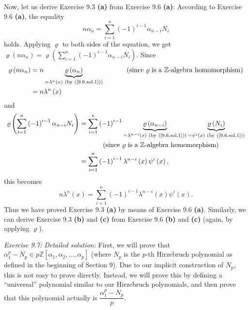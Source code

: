 \documentclass[numbers=enddot,12pt,final,onecolumn,notitlepage]{scrartcl}%
\begin{document}
Now, let us derive Exercise 9.3 \textbf{(a)} from Exercise 9.6 \textbf{(a)}:
According to Exercise 9.6 \textbf{(a)}, the equality%
\[
n\alpha_{n}=\sum_{i=1}^{n}\left(  -1\right)  ^{i-1}\alpha_{n-i}N_{i}%
\]
holds. Applying $\varrho$ to both sides of the equation, we get $\varrho
\left(  n\alpha_{n}\right)  =\varrho\left(  \sum\limits_{i=1}^{n}\left(
-1\right)  ^{i-1}\alpha_{n-i}N_{i}\right)  $. Since%
\begin{align*}
\varrho\left(  n\alpha_{n}\right)   &  =n\underbrace{\varrho\left(  \alpha
_{n}\right)  }_{=\lambda^{n}\left(  x\right)  \text{ (by (\ref{9.6.sol.1}))}%
}\ \ \ \ \ \ \ \ \ \ \left(  \text{since }\varrho\text{ is a }\mathbb{Z}%
\text{-algebra homomorphism}\right) \\
&  =n\lambda^{n}\left(  x\right)
\end{align*}
and%
\begin{align*}
\varrho\left(  \sum\limits_{i=1}^{n}\left(  -1\right)  ^{i-1}\alpha_{n-i}%
N_{i}\right)   &  =\sum\limits_{i=1}^{n}\left(  -1\right)  ^{i-1}%
\underbrace{\varrho\left(  \alpha_{n-i}\right)  }_{=\lambda^{n-i}\left(
x\right)  \text{ (by (\ref{9.6.sol.1}))}}\underbrace{\varrho\left(
N_{i}\right)  }_{=\psi^{i}\left(  x\right)  \text{ (by (\ref{9.6.sol.1}))}}\\
&  \ \ \ \ \ \ \ \ \ \ \left(  \text{since }\varrho\text{ is a }%
\mathbb{Z}\text{-algebra homomorphism}\right) \\
&  =\sum\limits_{i=1}^{n}\left(  -1\right)  ^{i-1}\lambda^{n-i}\left(
x\right)  \psi^{i}\left(  x\right)  ,
\end{align*}
this becomes%
\[
n\lambda^{n}\left(  x\right)  =\sum\limits_{i=1}^{n}\left(  -1\right)
^{i-1}\lambda^{n-i}\left(  x\right)  \psi^{i}\left(  x\right)  .
\]
Thus we have proved Exercise 9.3 \textbf{(a)} by means of Exercise 9.6
\textbf{(a)}. Similarly, we can derive Exercise 9.3 \textbf{(b)} and
\textbf{(c)} from Exercise 9.6 \textbf{(b)} and \textbf{(c)} (again, by
applying $\varrho$).

\textit{Exercise 9.7:} \textit{Detailed solution:} First, we will prove that
$\alpha_{1}^{p}-N_{p}\in p\mathbb{Z}\left[  \alpha_{1},\alpha_{2}%
,...,\alpha_{p}\right]  $ (where $N_{p}$ is the $p$-th Hirzebruch polynomial
as defined in the beginning of Section 9). Due to our implicit construction of
$N_{p}$, this is not easy to prove directly. Instead, we will prove this by
defining a ``universal'' polynomial similar to our Hirzebruch polynomials, and
then prove that this polynomial actually is $\dfrac{\alpha_{1}^{p}-N_{p}}{p}$.
\end{document}
